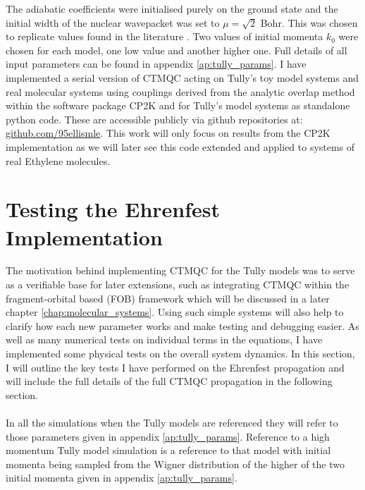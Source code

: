 The adiabatic coefficients were initialised purely on the ground state and the initial width of the nuclear wavepacket was set to $\mu = \sqrt{2}$ Bohr. This was chosen to replicate values found in the literature \cite{gossel_coupled-trajectory_2018}. Two values of initial momenta $k_0$ were chosen for each model, one low value and another higher one. Full details of all input parameters can be found in appendix \ref{ap:tully_params}. I have implemented a serial version of CTMQC acting on Tully's toy model systems and real molecular systems using couplings derived from the analytic overlap method \cite{gajdos_ultrafast_2014} within the software package CP2K \cite{cp2k} and for Tully's model systems as standalone python code. These are accessible publicly via github repositories at: \href{https://github.com/95ellismle}{github.com/95ellismle}. This work will only focus on results from the CP2K implementation as we will later see this code extended and applied to systems of real Ethylene molecules.

\section{Testing the Ehrenfest Implementation }
The motivation behind implementing CTMQC for the Tully models was to serve as a verifiable base for later extensions, such as integrating CTMQC within the fragment-orbital based (FOB) \cite{spencer_fob-sh:_2016} framework which will be discussed in a later chapter \ref{chap:molecular_systems}. Using such simple systems will also help to clarify how each new parameter works and make testing and debugging easier. As well as many numerical tests on individual terms in the equations,  I have implemented some physical tests on the overall system dynamics. In this section, I will outline the key tests I have performed on the Ehrenfest propagation and will include the full details of the full CTMQC propagation in the following section.
\\\\
In all the simulations when the Tully models are referenced they will refer to those parameters given in appendix \ref{ap:tully_params}. Reference to a high momentum Tully model simulation is a reference to that model with initial momenta being sampled from the Wigner distribution of the higher of the two initial momenta given in appendix \ref{ap:tully_params}.

